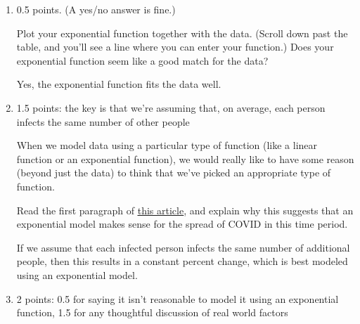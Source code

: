 \documentclass{article}
\makeatletter
\let\@href=\href
\renewcommand{\href}[2]{\@href{#1}{\ul{#2}}}
\makeatother
\begin{document}
\begin{enumerate}
\begin{enumerate}
  \item

    \begin{grading}
      0.5 points. (A yes/no answer is fine.) 
    \end{grading}

    \begin{problem}[\vfill\newpage]
      Plot your exponential function together with the data. (Scroll down past the table, and you'll see a line where you can enter your function.) Does your exponential function seem like a good match for the data?
    \end{problem}

    \begin{solution}
      Yes, the exponential function fits the data well.
    \end{solution}

  \item

    \begin{grading}
      1.5 points: the key is that we're assuming that, on average, each person infects the same number of other people 
    \end{grading}

    \begin{problem}[\vfill]
      When we model data using a particular type of function (like a linear function or an exponential function), we would really like to have some reason (beyond just the data) to think that we've picked an appropriate type of function.

      Read the first paragraph of \href{https://people.math.harvard.edu/~jjchen/mathma/docs/articles/how-fast-and-far-will-new-coronavirus-spread.html}{this article}, and explain why this suggests that an exponential model makes sense for the spread of COVID in this time period. 
    \end{problem}

    \begin{solution}
      If we assume that each infected person infects the same number of additional 
      people,
      then this results in a constant percent change, which is best modeled using
      an exponential model.
    \end{solution}

  \item

    \begin{grading}
      2 points: 0.5 for saying it isn't reasonable to model it using an exponential function, 1.5 for any thoughtful discussion of real world factors
    \end{grading}


\end{enumerate}
\end{enumerate}
\end{document}
